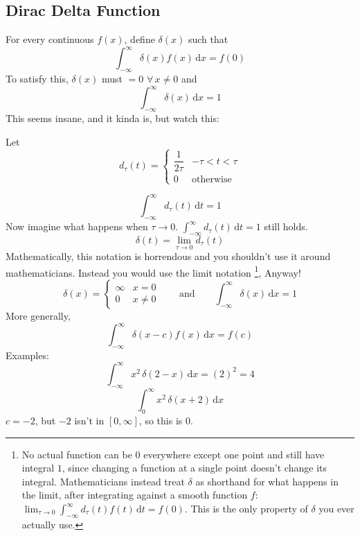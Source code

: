 \documentclass[11pt]{article}
\newcommand{\dd}{\,\mathrm{d}}
\begin{document}
\subsection{Dirac Delta Function}

For every continuous $f(x)$, define $\delta(x)$ such that
\[
  \int_{-\infty}^{\infty}\delta(x)f(x)\dd x = f(0)
\]
To satisfy this, $\delta(x)$ must $=0$ $\forall\,x\neq0$ and
\[
  \int_{-\infty}^{\infty}\delta(x)\dd x = 1
\]
This seems insane, and it kinda is, but watch this:

Let
\[
  d_\tau(t) =
  \begin{cases}
    \dfrac{1}{2\tau} & -\tau<t<\tau\\[1.5ex]
    0 & \text{otherwise}
  \end{cases}
\]

\begin{center}
\end{center}

\[
  \int_{-\infty}^{\infty}d_\tau(t)\dd t = 1
\]
Now imagine what happens when $\tau\to0$. $\displaystyle\int_{-\infty}^{\infty}d_\tau(t)\dd t=1$ still holds.
\[
  \delta(t) = \lim_{\tau\to0}d_\tau(t)
\]
Mathematically, this notation is horrendous and you shouldn't use it around mathematicians. Instead you would use the limit notation
\footnote{No actual function can be $0$ everywhere except one point and still have integral $1$, since changing a function at a single point doesn't change its integral. Mathematicians instead treat $\delta$ as shorthand for what happens in the limit, after integrating against a smooth function $f$:
$\lim_{\tau\to0}\int_{-\infty}^{\infty}d_\tau(t)f(t)\dd t=f(0)$.
This is the only property of $\delta$ you ever actually use.}, 
Anyway!
\[
  \delta(x) =
  \begin{cases}
    \infty & x=0\\
    0 & x\neq0
  \end{cases}
  \qquad\text{and}\qquad
  \int_{-\infty}^{\infty}\delta(x)\dd x = 1
\]
More generally,
\[
  \int_{-\infty}^{\infty}\delta(x-c)f(x)\dd x = f(c)
\]
Examples:
\[
  \int_{-\infty}^{\infty}x^2\,\delta(2-x)\dd x = (2)^2 = 4
\]
\[
  \int_0^{\infty}x^2\,\delta(x+2)\dd x
\]
$c=-2$, but $-2$ isn't in $[0,\infty]$, so this is $0$.
\end{document}
